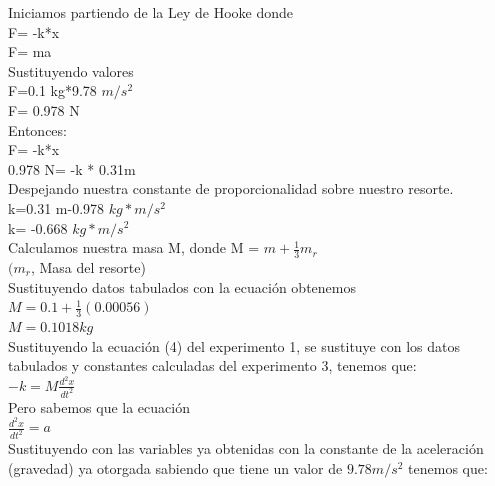 \documentclass[10pt]{article}
\begin{document}
\begin{multicols}{2}
\begin{center}
\begin{adjustbox}{width=245pt}
\begin{tabular}{|c|c|c|c|c|c|}
		\end{tabular}
	\end{adjustbox}
\end{center}

Iniciamos partiendo de la Ley de Hooke donde \\
 F= -k*x \\
 F= ma \\
Sustituyendo valores \\

 F=0.1 kg*9.78 $m/s^2$   \\
 F= 0.978 N \\
Entonces: \\
 F= -k*x \\
0.978 N= -k * 0.31m \\
Despejando nuestra constante de proporcionalidad sobre nuestro resorte. \\
 k=0.31 m-0.978 $ kg*m/s^{2}$\\
 k= -0.668 $kg*m/s^{2} $\\
Calculamos nuestra masa M, donde M = $m + \frac{1}{3} m_{r}$ \\
 $(m_{r}$, Masa del resorte)\\
Sustituyendo datos tabulados con la ecuación obtenemos \\
 $M=0.1+ \frac{1}{3}  (0.00056)$\\
$M=0.1018 kg$\\

Sustituyendo la ecuación (4) del experimento 1, se sustituye con los datos tabulados y constantes calculadas del experimento 3, tenemos que:\\

$
-k=M\frac{d^{2}x}{dt^{2}}
$\\
Pero sabemos que la ecuación\\
$ \frac{d^{2}x}{dt^{2}}=a$\\
Sustituyendo con las variables ya obtenidas con la constante de la aceleración (gravedad) ya otorgada sabiendo que tiene un valor de $9.78 m/s^2$  tenemos que: \\


\end{multicols}
\end{document}
